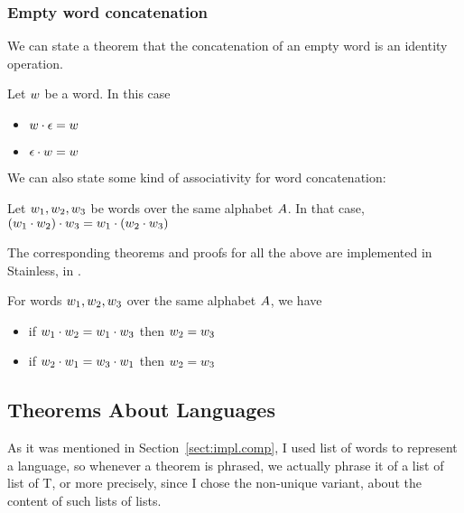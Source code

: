 \subsubsection{Empty word concatenation}

We can state a theorem that the concatenation of an empty word is an identity operation.

\begin{theorem}
	\label{the:emptyword}
	Let $w$ be a word. In this case 
	\begin{itemize}
		\item $w \cdot \epsilon = w$
		\item $\epsilon \cdot w = w$
	\end{itemize}
\end{theorem}

We can also state some kind of associativity for word concatenation:

\begin{theorem}
	Let $w_{1}, w_{2}, w_{3}$ be words over the same alphabet $A$. In that case, $(w_{1} \cdot w_{2}) \cdot w_{3} = w_{1} \cdot (w_{2} \cdot w_{3})$ 
\end{theorem}

The corresponding theorems and proofs for all the above are implemented in Stainless, in .

\begin{theorem}
	For words $w_{1}, w_{2}, w_{3}$ over the same alphabet $A$, we have
	\begin{itemize}
		\item if $w_{1} \cdot w_{2} = w_{1} \cdot w_{3}$ then $w_{2} = w_{3}$
		\item if $w_{2} \cdot w_{1} = w_{3} \cdot w_{1}$ then $w_{2} = w_{3}$
	\end{itemize}
\end{theorem}

\subsection{Theorems About Languages}

As it was mentioned in Section~\ref{sect:impl.comp}, I used list of words to represent a language, so whenever a theorem is phrased, we actually phrase it of a list of list of T, or more precisely, since I chose the non-unique variant, about the content of such lists of lists.


